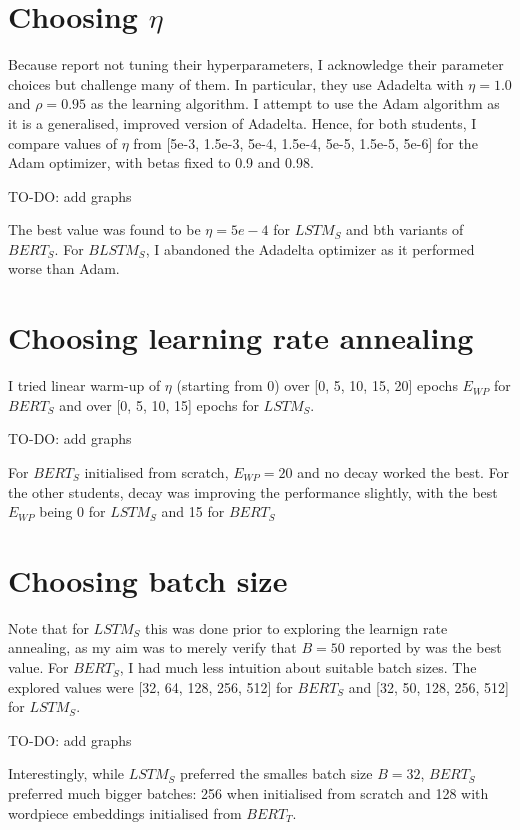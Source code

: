 \documentclass[bsc,frontabs,twoside,singlespacing,parskip,deptreport]{infthesis}
\begin{document}
{  \section{Choosing $\eta$}{
    Because \citet{Tang_2019b} report not tuning their hyperparameters, I acknowledge their parameter choices but challenge many of them. In particular, they use Adadelta with $\eta=1.0$ and $\rho=0.95$ as the learning algorithm. I attempt to use the Adam algorithm as it is a generalised, improved version of Adadelta.
    Hence, for both students, I compare values of $\eta$ from [5e-3, 1.5e-3, 5e-4, 1.5e-4, 5e-5, 1.5e-5, 5e-6] for the Adam optimizer, with betas fixed to 0.9 and 0.98.
    
    TO-DO: add graphs

    The best value was found to be $\eta=5e-4$ for $LSTM_S$ and bth variants of $BERT_S$. For $BLSTM_S$, I abandoned the Adadelta optimizer as it performed worse than Adam.
  }

  \section{Choosing learning rate annealing}{
    I tried linear warm-up of $\eta$ (starting from 0) over [0, 5, 10, 15, 20] epochs $E_{WP}$ for $BERT_S$ and over [0, 5, 10, 15] epochs for $LSTM_S$.

    TO-DO: add graphs

    For $BERT_S$ initialised from scratch, $E_{WP}=20$ and no decay worked the best. For the other students, decay was improving the performance slightly, with the best $E_{WP}$ being 0 for $LSTM_S$ and 15 for $BERT_S$
  }

  \section{Choosing batch size}{
    Note that for $LSTM_S$ this was done prior to exploring the learnign rate annealing, as my aim was to merely verify that $B=50$ reported by \citet{Tang_2019b} was the best value. For $BERT_S$, I had much less intuition about suitable batch sizes. The explored values were [32, 64, 128, 256, 512] for $BERT_S$ and [32, 50, 128, 256, 512] for $LSTM_S$.

    TO-DO: add graphs

    Interestingly, while $LSTM_S$ preferred the smalles batch size $B=32$, $BERT_S$ preferred much bigger batches: 256 when initialised from scratch and 128 with wordpiece embeddings initialised from $BERT_T$.
  }

}
\end{document}
